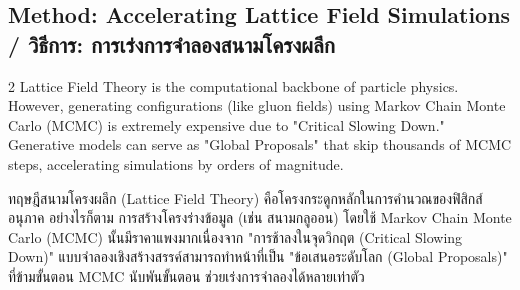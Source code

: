 \subsection{Method: Accelerating Lattice Field Simulations \quad / \quad \textthai{วิธีการ: การเร่งการจำลองสนามโครงผลึก}}
\begin{paracol}{2}
Lattice Field Theory is the computational backbone of particle physics. However, generating configurations (like gluon fields) using Markov Chain Monte Carlo (MCMC) is extremely expensive due to "Critical Slowing Down." Generative models can serve as "Global Proposals" that skip thousands of MCMC steps, accelerating simulations by orders of magnitude.

\switchcolumn

\begin{thai}
ทฤษฎีสนามโครงผลึก (Lattice Field Theory) คือโครงกระดูกหลักในการคำนวณของฟิสิกส์อนุภาค อย่างไรก็ตาม การสร้างโครงร่างข้อมูล (เช่น สนามกลูออน) โดยใช้ Markov Chain Monte Carlo (MCMC) นั้นมีราคาแพงมากเนื่องจาก "การช้าลงในจุดวิกฤต (Critical Slowing Down)" แบบจำลองเชิงสร้างสรรค์สามารถทำหน้าที่เป็น "ข้อเสนอระดับโลก (Global Proposals)" ที่ข้ามขั้นตอน MCMC นับพันขั้นตอน ช่วยเร่งการจำลองได้หลายเท่าตัว
\end{thai}
\end{paracol}
